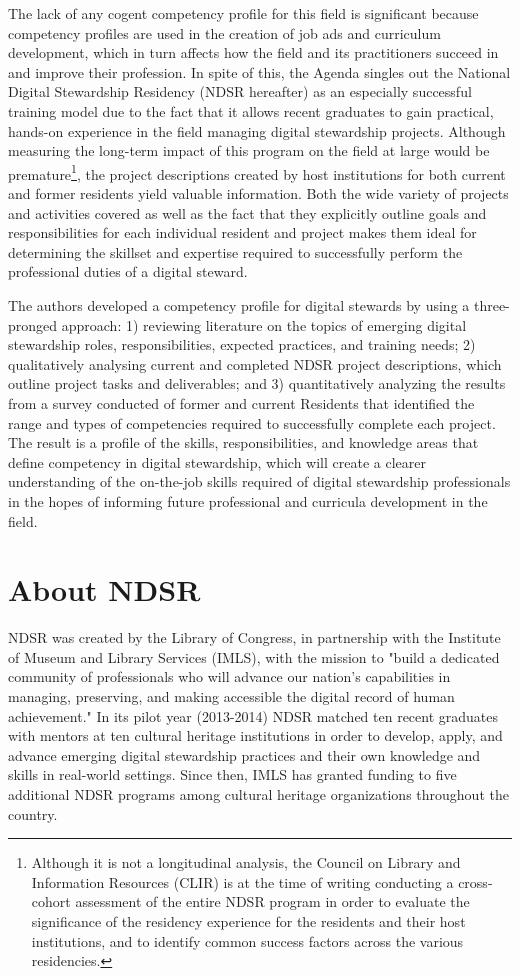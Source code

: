 \documentclass{acm_proc_article-sp}
\begin{document}
The lack of any cogent competency profile for this field is significant because competency profiles are used in the creation of job ads and curriculum development, which in turn affects how the field and its practitioners succeed in and improve their profession. In spite of this, the Agenda singles out the National Digital Stewardship Residency (NDSR hereafter) as an especially successful training model due to the fact that it allows recent graduates to gain practical, hands-on experience in the field managing digital stewardship projects. Although measuring the long-term impact of this program on the field at large would be premature\footnote{Although it is not a longitudinal analysis, the Council on Library and Information Resources (CLIR) is at the time of writing conducting a cross-cohort assessment of the entire NDSR program in order to evaluate the significance of the residency experience for the residents and their host institutions, and to identify common success factors across the various residencies.\cite{2}}, the project descriptions created by host institutions for both current and former residents yield valuable information. Both the wide variety of projects and activities covered as well as the fact that they explicitly outline goals and responsibilities for each individual resident and project makes them ideal for determining the skillset and expertise required to successfully perform the professional duties of a digital steward. 

The authors developed a competency profile for digital stewards by using a three-pronged approach: 1) reviewing literature on the topics of emerging digital stewardship roles, responsibilities, expected practices, and training needs; 2) qualitatively analysing current and completed NDSR project descriptions, which outline project tasks and deliverables; and 3) quantitatively analyzing the results from a survey conducted of former and current Residents that identified the range and types of competencies required to successfully complete each project. The result is a profile of the skills, responsibilities, and knowledge areas that define competency in digital stewardship, which will create a clearer understanding of the on-the-job skills required of digital stewardship professionals in the hopes of informing future professional and curricula development in the field.

\section{About NDSR}
NDSR was created by the Library of Congress, in partnership with the Institute of Museum and Library Services (IMLS), with the mission to "build a dedicated community of professionals who will advance our nation's capabilities in managing, preserving, and making accessible the digital record of human achievement."\cite{3} In its pilot year (2013-2014) NDSR matched ten recent graduates with mentors at ten cultural heritage institutions in order to develop, apply, and advance emerging digital stewardship practices and their own knowledge and skills in real-world settings. Since then, IMLS has granted funding to five additional NDSR programs among cultural heritage organizations throughout the country.
\end{document}
